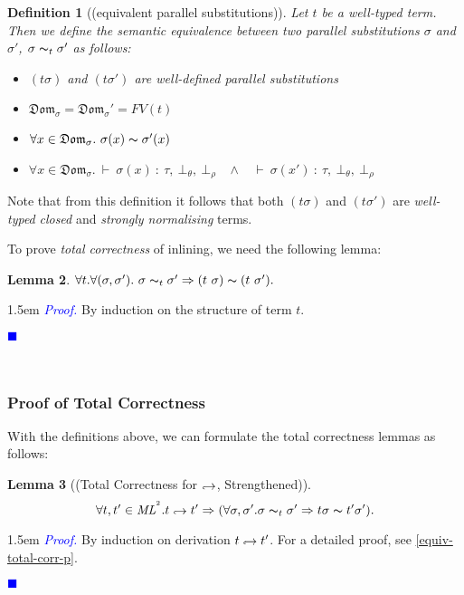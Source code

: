 \documentclass[a4paper,11pt,oneside]{article}
\theoremstyle{plain}
\newtheorem{definition}{Definition}[subsection]
\newtheorem{lemma}[definition]{Lemma}
\renewenvironment{proof}{\noindent \begin{adjustwidth}{1.5em}{} \textcolor{blue}{\textit{Proof.}}}
{{\begin{tiny}\textcolor{blue}{$\blacksquare$}\end{tiny}}
\end{adjustwidth}~\\\noindent}
\newcommand{\tmapp}[2]{(#1 ~ #2)}
\newcommand{\bwedge}{\boldsymbol{~\wedge~}}
\newcommand{\typing}[4]{\vdash~#1~:~#2,~#3,~#4}
\newcommand{\eqvsbst}[2]{#1 \thicksim_{#2} #1'}
\newcommand{\inlsrc}{\textit{ML}^{^2}}
\newcommand{\hookdownarrow}{\mathrel{\rotatebox[origin=c]{180}{$\hookleftarrow$}}}
\newcommand{\ilarr}{\hookdownarrow}
\newcommand{\il}[2]{#1 \ilarr #2}
\begin{document}
	\begin{definition}[(equivalent parallel substitutions)]
	Let $t$ be a well-typed term. Then we define the semantic equivalence
	between two parallel substitutions $\sigma$ and $\sigma'$, 
	$\sigma \thicksim_t \sigma'$ as follows:
	\begin{itemize}
	\item[(1)] 
	  $(t\sigma)$ and $(t\sigma')$ are well-defined parallel substitutions
	\item[(2)]
	  $ \mathfrak{Dom}_\sigma = \mathfrak{Dom}_\sigma' = FV(t)$
	\item[(3)]
		$ \forall x \in \mathfrak{Dom}_\sigma.~ \sigma(x) \thicksim \sigma'(x)$
	\item[(4)]
		$ \forall x \in \mathfrak{Dom}_\sigma.~ 
		\typing{\sigma(x)}{\tau}{\bot_{\theta}}{\bot_{\rho}} ~~~\bwedge~~~
		\typing{\sigma(x')}{\tau}{\bot_{\theta}}{\bot_{\rho}} $
	\end{itemize}	 
	\label{equiv-subst-d}
	\end{definition}

	Note that from this definition it follows that both $(t\sigma)$ and 
	$(t\sigma')$ are \textit{well-typed }\textit{closed} and \textit{strongly normalising} terms.

	To prove \textit{total correctness} of inlining, we need the following lemma:	
	
	\begin{lemma} 
		$\forall t. \forall (\sigma, \sigma'). ~\eqvsbst{\sigma}{t}
		\Rightarrow \tmapp{t}{\sigma} \thicksim \tmapp{t}{\sigma'}.$ 
	\label{equiv-subst-l}
	\end{lemma}

	\begin{proof}
		By induction on the structure of term $t$. 
	\end{proof}





\subsubsection*{Proof of Total Correctness}


	With the definitions above, we can formulate the total correctness lemmas as follows:
 \begin{lemma}[(Total Correctness for $\ilarr$, Strengthened)]
   $$ \forall t,t' \in \inlsrc. \il{t}{t'} \Rightarrow (\forall \sigma, \sigma'. \sigma \thicksim_t \sigma' \Rightarrow t\sigma \thicksim t'\sigma').$$
  \end{lemma}
	\begin{proof}
	 By induction on derivation $\il{t}{t'}$. For a detailed proof, see \ref{equiv-total-corr-p}.
	\end{proof}	  
  
\end{document}

